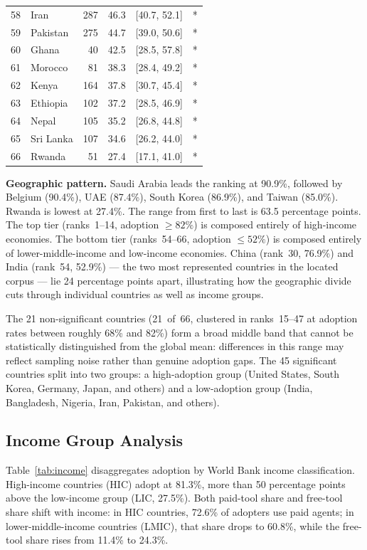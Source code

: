 \begin{table}[h]
\begin{tabular}{@{}rlrrrr@{}}
58 & Iran         &   287 & 46.3 & [40.7, 52.1] & * \\
59 & Pakistan     &   275 & 44.7 & [39.0, 50.6] & * \\
60 & Ghana        &    40 & 42.5 & [28.5, 57.8] & * \\
61 & Morocco      &    81 & 38.3 & [28.4, 49.2] & * \\
62 & Kenya        &   164 & 37.8 & [30.7, 45.4] & * \\
63 & Ethiopia     &   102 & 37.2 & [28.5, 46.9] & * \\
64 & Nepal        &   105 & 35.2 & [26.8, 44.8] & * \\
65 & Sri Lanka    &   107 & 34.6 & [26.2, 44.0] & * \\
66 & Rwanda       &    51 & 27.4 & [17.1, 41.0] & * \\
\bottomrule
\end{tabular}
\end{table}

\noindent\textbf{Geographic pattern.}
Saudi Arabia leads the ranking at 90.9\%, followed by Belgium (90.4\%), UAE (87.4\%), South Korea (86.9\%), and Taiwan (85.0\%). Rwanda is lowest at 27.4\%. The range from first to last is 63.5 percentage points. The top tier (ranks~1--14, adoption $\geq 82\%$) is composed entirely of high-income economies. The bottom tier (ranks~54--66, adoption $\leq 52\%$) is composed entirely of lower-middle-income and low-income economies. China (rank~30, 76.9\%) and India (rank~54, 52.9\%) --- the two most represented countries in the located corpus --- lie 24 percentage points apart, illustrating how the geographic divide cuts through individual countries as well as income groups.

The 21 non-significant countries (21~of~66, clustered in ranks~15--47 at adoption rates between roughly 68\% and 82\%) form a broad middle band that cannot be statistically distinguished from the global mean: differences in this range may reflect sampling noise rather than genuine adoption gaps. The 45 significant countries split into two groups: a high-adoption group (United States, South Korea, Germany, Japan, and others) and a low-adoption group (India, Bangladesh, Nigeria, Iran, Pakistan, and others).

\subsection{Income Group Analysis}

Table~\ref{tab:income} disaggregates adoption by World Bank income classification. High-income countries (HIC) adopt at 81.3\%, more than 50 percentage points above the low-income group (LIC, 27.5\%). Both paid-tool share and free-tool share shift with income: in HIC countries, 72.6\% of adopters use paid agents; in lower-middle-income countries (LMIC), that share drops to 60.8\%, while the free-tool share rises from 11.4\% to 24.3\%.

